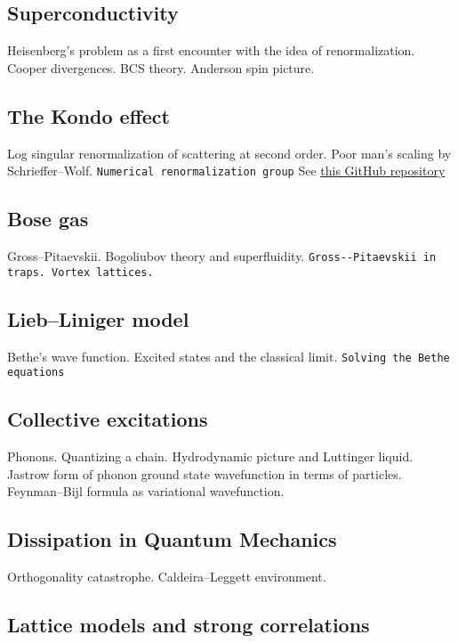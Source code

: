 \subsection{Superconductivity}

Heisenberg's problem as a first encounter with the idea of renormalization. Cooper divergences. BCS theory. Anderson spin picture.

\subsection{The Kondo effect}

Log singular renormalization of scattering at second order. Poor man's scaling by Schrieffer--Wolf. \verb|Numerical renormalization group| See \href{https://github.com/LucasNogueiraMartins/NRG-Didactic}{this GitHub repository}

\subsection{Bose gas}

Gross--Pitaevskii. Bogoliubov theory and superfluidity. \verb|Gross--Pitaevskii in traps. Vortex lattices.|

\subsection{Lieb--Liniger model}

Bethe's wave function. Excited states and the classical limit. \verb|Solving the Bethe equations|

\subsection{Collective excitations}

Phonons. Quantizing a chain. Hydrodynamic picture and Luttinger liquid. Jastrow form of phonon ground state wavefunction in terms of particles. Feynman–Bijl formula as variational wavefunction. 

\subsection{Dissipation in Quantum Mechanics}

Orthogonality catastrophe. Caldeira--Leggett environment.

\subsection{Lattice models and strong correlations}

